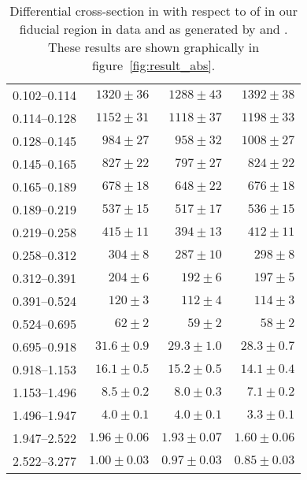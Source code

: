 \begin{table}
\begin{center}
\begin{tabular}{@{}l r r r@{}}
            0.102--0.114  &  $1320  \pm  36$    &  $1288  \pm  43$    &  $1392  \pm  38$    \\
            0.114--0.128  &  $1152  \pm  31$    &  $1118  \pm  37$    &  $1198  \pm  33$    \\
            0.128--0.145  &  $984   \pm  27$    &  $958   \pm  32$    &  $1008  \pm  27$    \\
            0.145--0.165  &  $827   \pm  22$    &  $797   \pm  27$    &  $824   \pm  22$    \\
            0.165--0.189  &  $678   \pm  18$    &  $648   \pm  22$    &  $676   \pm  18$    \\
            0.189--0.219  &  $537   \pm  15$    &  $517   \pm  17$    &  $536   \pm  15$    \\
            0.219--0.258  &  $415   \pm  11$    &  $394   \pm  13$    &  $412   \pm  11$    \\
            0.258--0.312  &  $304   \pm  8$     &  $287   \pm  10$    &  $298   \pm  8$     \\
            0.312--0.391  &  $204   \pm  6$     &  $192   \pm  6$     &  $197   \pm  5$     \\
            0.391--0.524  &  $120   \pm  3$     &  $112   \pm  4$     &  $114   \pm  3$     \\
            0.524--0.695  &  $62    \pm  2$     &  $59    \pm  2$     &  $58    \pm  2$     \\
            0.695--0.918  &  $31.6  \pm  0.9$   &  $29.3  \pm  1.0$   &  $28.3  \pm  0.7$   \\
            0.918--1.153  &  $16.1  \pm  0.5$   &  $15.2  \pm  0.5$   &  $14.1  \pm  0.4$   \\
            1.153--1.496  &  $8.5   \pm  0.2$   &  $8.0   \pm  0.3$   &  $7.1   \pm  0.2$   \\
            1.496--1.947  &  $4.0   \pm  0.1$   &  $4.0   \pm  0.1$   &  $3.3   \pm  0.1$   \\
            1.947--2.522  &  $1.96  \pm  0.06$  &  $1.93  \pm  0.07$  &  $1.60  \pm  0.06$  \\
            2.522--3.277  &  $1.00  \pm  0.03$  &  $0.97  \pm  0.03$  &  $0.85  \pm  0.03$  \\
            \bottomrule
        \end{tabular}
    \end{center}
    \caption[
        Differential cross-section in \pb with respect to \phistar of \Ztoee.
    ]{
        Differential cross-section in \pb with respect to \phistar of \Ztoee in
        our fiducial region in data and as generated by \MADGRAPH and \POWHEG.
        These results are shown graphically in figure~\ref{fig:result_abs}.
    }
    \label{tab:results_abs}
\end{table}
